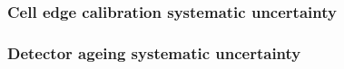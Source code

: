
\subsubsection{Cell edge calibration systematic uncertainty}

\subsubsection{Detector ageing systematic uncertainty}

